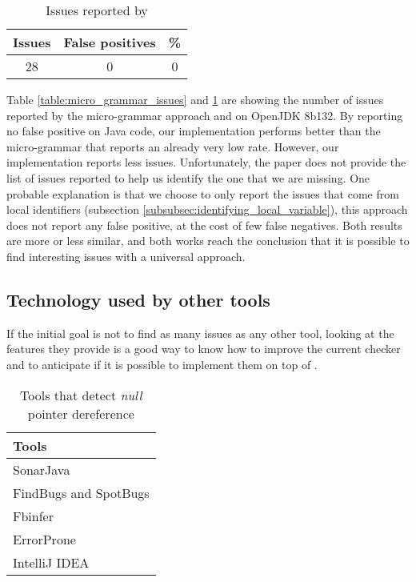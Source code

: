 \begin{table}[h]
	\centering
	\caption{Issues reported by \slang{}}
	\label{table:slang_issues_jdk8}
	\begin{tabular}{|c|c|c|}
		\hline
		\bf Issues & \bf False positives & \bf \% \\ \hline
		28 &  0 &  0 \\ \hline
	\end{tabular}
\end{table}

Table \ref{table:micro_grammar_issues} and \ref{table:slang_issues_jdk8} are showing the number of issues reported by the micro-grammar approach and \slang{} on OpenJDK 8b132.
By reporting no false positive on Java code, our implementation performs better than the micro-grammar that reports an already very low rate.
However, our implementation reports less issues.
Unfortunately, the paper does not provide the list of issues reported to help us identify the one that we are missing.
One probable explanation is that we choose to only report the issues that come from local identifiers (subsection \ref{subsubsec:identifying_local_variable}), this approach does not report any false positive, at the cost of few false negatives.
Both results are more or less similar, and both works reach the conclusion that it is possible to find interesting issues with a universal approach.

\subsection{Technology used by other tools}
\label{subsec:other_tools_technology}

If the initial goal is not to find as many issues as any other tool, looking at the features they provide is a good way to know how to improve the current checker and to anticipate if it is possible to implement them on top of \slang{}.

\begin{table}[h]
	\centering
	\caption{Tools that detect \emph{null} pointer dereference}
	\label{table:tools_features}
	\begin{tabular}{|l|}
		\hline
		\bf Tools \\
		\hline
		SonarJava \cite{SonarJava:2019:Online} \\
		FindBugs \cite{Hovemeyer:2004:FBE:1052883.1052895} and SpotBugs \cite{spotBugs:2019:Online} \\
		Fbinfer \cite{fbInfer:2019:Online} \\
		ErrorProne \cite{errorProne:2019:Online} \\
		IntelliJ IDEA \cite{intelJIDEA:2019:Online} \\
		\hline    
	\end{tabular}
\end{table}


